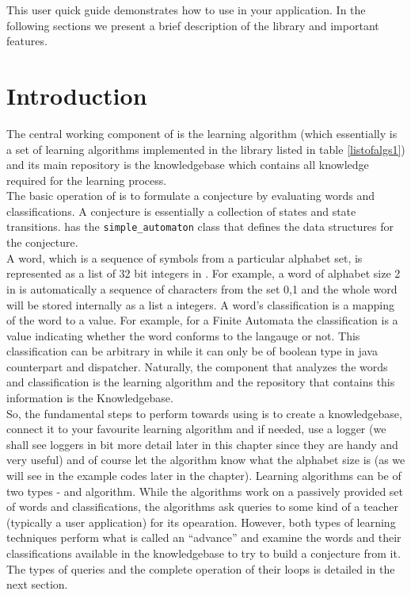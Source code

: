
This user quick guide demonstrates how to use \libalf in your application. In the following sections we present a brief description of the library and important features.

\section{Introduction}
The central working component of \libalf is the learning algorithm (which essentially is a set of learning algorithms implemented in the library listed in table \ref{listofalgs1}) and its main repository is the knowledgebase which contains all knowledge required for the learning process. \\

The basic operation of \libalf is to formulate a conjecture by evaluating words and classifications. A conjecture is essentially a collection of states and state transitions. \libalf has the \texttt{simple\_automaton} class that defines the data structures for the conjecture.\\
A word, which is a sequence of symbols from a particular alphabet set, is represented as a list of 32 bit integers in \libalf. For example, a word of alphabet size 2 in \libalf is automatically a sequence of characters from the set {0,1} and the whole word will be stored internally as a list a integers. A word's classification is a mapping of the word to a value. For example, for a Finite Automata the classification is a value indicating whether the word conforms to the langauge or not. This classification can be arbitrary in \libalf while it can only be of boolean type in java counterpart \jalf and dispatcher. Naturally, the component that analyzes the words and classification is the learning algorithm and the repository that contains this information is the Knowledgebase.
\\
So, the fundamental steps to perform towards using \libalf is to create a knowledgebase, connect it to your favourite learning algorithm and if needed, use a logger (we shall see loggers in bit more detail later in this chapter since they are handy and very useful) and of course let the algorithm know what the alphabet size is (as we will see in the example codes later in the chapter). Learning algorithms can be of two types - \online and \offline algorithm. While the \offline algorithms work on a passively provided set of words and classifications, the \online algorithms ask queries to some kind of a teacher (typically a user application) for its opearation. However, both types of learning techniques perform what is called an ``advance'' and examine the words and their classifications available in the knowledgebase to try to build a conjecture from it. The types of queries and the complete operation of their loops is detailed in the next section.


